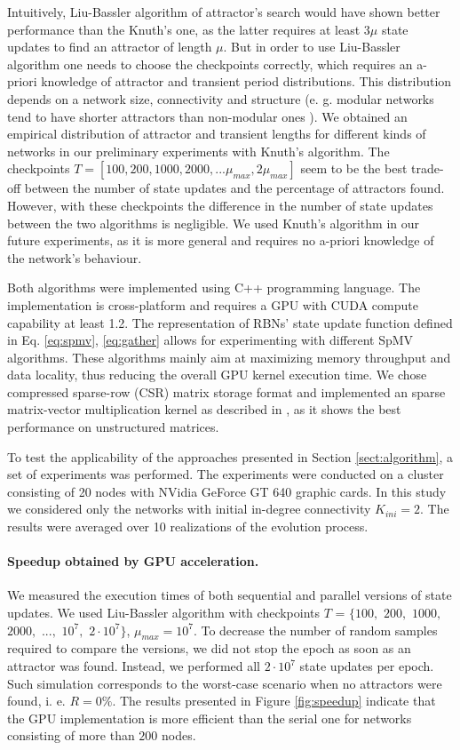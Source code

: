 \documentclass[procedia]{easychair}
\begin{document}
	Intuitively, Liu-Bassler algorithm of attractor's search would have shown better performance than the Knuth's one, as the latter requires at least $3 \mu$ state updates to find an attractor of length $\mu$. But in order to use Liu-Bassler algorithm one needs to choose the checkpoints correctly, which requires an a-priori knowledge of attractor and transient period distributions. This distribution depends on a network size, connectivity and structure (e. g. modular networks tend to have shorter attractors than non-modular ones \cite{Gorski2016}). We obtained an empirical distribution of attractor and transient lengths for different kinds of networks in our preliminary experiments with Knuth's algorithm. The checkpoints $T=[100, 200, 1000, 2000, ... \mu_{max}, 2 \mu_{max}]$ seem to be the best trade-off between the number of state updates and the percentage of attractors found. However, with these checkpoints the difference in the number of state updates between the two algorithms is negligible. We used Knuth's algorithm in our future experiments, as it is more general and requires no a-priori knowledge of the network's behaviour.
	
	Both algorithms were implemented using C++ programming language. The implementation is cross-platform and requires a GPU with CUDA compute capability at least 1.2. The representation of RBNs' state update function defined in Eq. \ref{eq:spmv}, \ref{eq:gather} allows for experimenting with different SpMV algorithms. These algorithms mainly aim at maximizing memory throughput and data locality, thus reducing the overall GPU kernel execution time. We chose compressed sparse-row (CSR) matrix storage format and implemented an sparse matrix-vector multiplication kernel as described in \cite{bell2008efficient}, as it shows the best performance on unstructured matrices.
	
	To test the applicability of the approaches presented in Section \ref{sect:algorithm}, a set of experiments was performed. The experiments were conducted on a cluster consisting of 20 nodes with NVidia GeForce GT 640 graphic cards. In this study we considered only the networks with initial in-degree connectivity $K_{ini}=2$. The results were averaged over 10 realizations of the evolution process.
	
	\paragraph{Speedup obtained by GPU acceleration.} We measured the execution times of both sequential and parallel versions of state updates. We used Liu-Bassler algorithm with checkpoints $T$ = $\{100,$ $200,$ $1000,$ $2000,$ $...,$ $10^7,$ $2 \cdot 10^7\}$, $\mu_{max} = 10^7$. To decrease the number of random samples required to compare the versions, we did not stop the epoch as soon as an attractor was found. Instead, we performed all $2 \cdot 10^7$ state updates per epoch. Such simulation corresponds to the worst-case scenario when no attractors were found, i. e. $R = 0\%$. The results presented in Figure \ref{fig:speedup} indicate that the GPU implementation is more efficient than the serial one for networks consisting of more than $200$ nodes.
	
\end{document}
